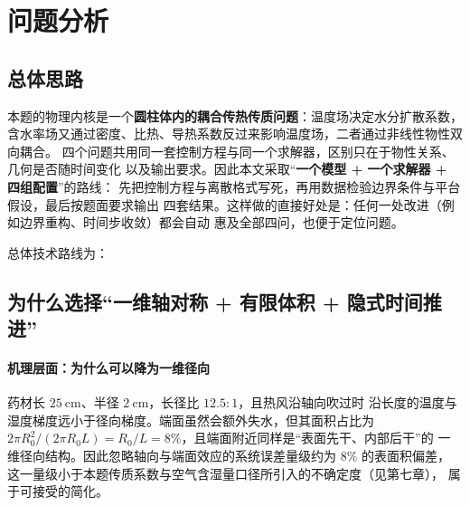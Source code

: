 \section{问题分析}

\subsection{总体思路}

本题的物理内核是一个\textbf{圆柱体内的耦合传热传质问题}：温度场决定水分扩散系数，
含水率场又通过密度、比热、导热系数反过来影响温度场，二者通过非线性物性双向耦合。
四个问题共用同一套控制方程与同一个求解器，区别只在于物性关系、几何是否随时间变化
以及输出要求。因此本文采取“\textbf{一个模型 + 一个求解器 + 四组配置}”的路线：
先把控制方程与离散格式写死，再用数据检验边界条件与平台假设，最后按题面要求输出
四套结果。这样做的直接好处是：任何一处改进（例如边界重构、时间步收敛）都会自动
惠及全部四问，也便于定位问题。

总体技术路线为：

\begin{center}
\end{center}

\subsection{为什么选择“一维轴对称 + 有限体积 + 隐式时间推进”}

\paragraph{机理层面：为什么可以降为一维径向}
药材长 $25\ \mathrm{cm}$、半径 $2\ \mathrm{cm}$，长径比 $12.5:1$，且热风沿轴向吹过时
沿长度的温度与湿度梯度远小于径向梯度。端面虽然会额外失水，但其面积占比为
$2\pi R_0^2/(2\pi R_0 L)=R_0/L=8\%$，且端面附近同样是“表面先干、内部后干”的
一维径向结构。因此忽略轴向与端面效应的系统误差量级约为 $8\%$ 的表面积偏差，
这一量级小于本题传质系数与空气含湿量口径所引入的不确定度（见第七章），
属于可接受的简化。

